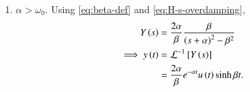 \documentclass[journal,12pt,twocolumn]{IEEEtran}
\begin{document}
\begin{enumerate}[label=\theenumi.]
\begin{enumerate}
        \item \(\alpha > \omega_0\). Using \eqref{eq:beta-def} and
        \eqref{eq:H-s-overdamping},
        \begin{align}
            Y\left(s\right) &= \frac{2\alpha}{\beta}\frac{\beta}{\left(s + \alpha\right)^2 - \beta^2} \\
            \implies y\left(t\right) &= \mathcal{L}^{-1}{}\left[Y\left(s\right)\right] \nonumber \\
            &= \frac{2\alpha}{\beta}e^{-\alpha{}t}u\left(t\right)\sinh\beta{}t.
        \end{align}
    \end{enumerate}
\end{enumerate}
\end{document}
